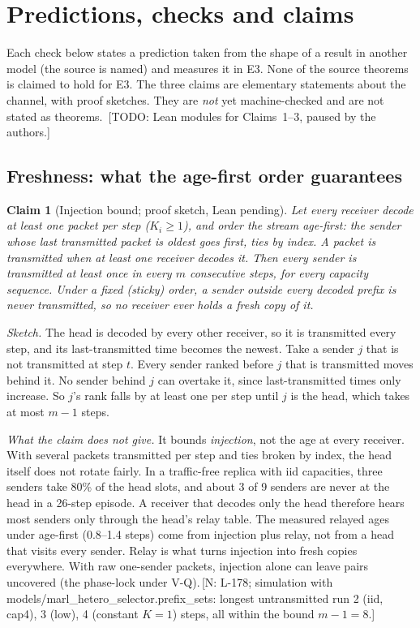 \documentclass[11pt]{article}
\newtheorem{claim}{Claim}
\theoremstyle{definition}
\newif\ifshownotes\shownotestrue
\newcommand{\NOTE}[1]{\ifshownotes{\color{notecol}\,\textsf{\footnotesize[N: #1]}}\fi}
\newcommand{\TODO}[1]{\ifshownotes{\color{todocol}\,\textsf{\footnotesize[TODO: #1]}}\fi}
\begin{document}
\section{Predictions, checks and claims}\label{sec:theory}
Each check below states a prediction taken from the shape of a result in another model (the source is named) and
measures it in E3. None of the source theorems is claimed to hold for E3. The three claims are elementary statements
about the channel, with proof sketches. They are \emph{not} yet machine-checked and are not stated as theorems.
\TODO{Lean modules for Claims~1--3, paused by the authors.}

\subsection{Freshness: what the age-first order guarantees}
\begin{claim}[Injection bound; proof sketch, Lean pending]\label{cl:age}
Let every receiver decode at least one packet per step ($K_i\ge1$), and order the stream age-first: the sender whose last
transmitted packet is oldest goes first, ties by index. A packet is transmitted when at least one receiver decodes it.
Then every sender is transmitted at least once in every $m$ consecutive steps, for every capacity sequence. Under a fixed
(sticky) order, a sender outside every decoded prefix is never transmitted, so no receiver ever holds a fresh copy of it.
\end{claim}
\emph{Sketch.} The head is decoded by every other receiver, so it is transmitted every step, and its last-transmitted
time becomes the newest. Take a sender $j$ that is not transmitted at step $t$. Every sender ranked before $j$ that is
transmitted moves behind it. No sender behind $j$ can overtake it, since last-transmitted times only increase. So $j$'s
rank falls by at least one per step until $j$ is the head, which takes at most $m-1$ steps.

\emph{What the claim does not give.} It bounds \emph{injection}, not the age at every receiver. With several packets
transmitted per step and ties broken by index, the head itself does not rotate fairly. In a traffic-free replica with iid
capacities, three senders take 80\% of the head slots, and about 3 of 9 senders are never at the head in a 26-step
episode. A receiver that decodes only the head therefore hears most senders only through the head's relay table. The
measured relayed ages under age-first (0.8--1.4 steps) come from injection plus relay, not from a head that visits every
sender. Relay is what turns injection into fresh copies everywhere. With raw one-sender packets, injection alone can
leave pairs uncovered (the phase-lock under V-Q).\NOTE{L-178; simulation with models/marl\_hetero\_selector.prefix\_sets:
longest untransmitted run 2 (iid, cap4), 3 (low), 4 (constant $K=1$) steps, all within the bound $m-1=8$.}
\end{document}
